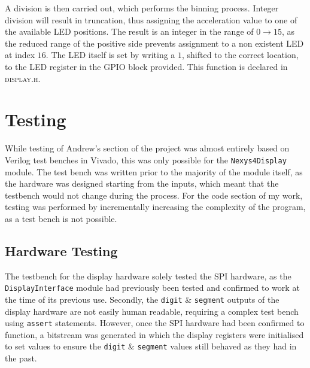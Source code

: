 \documentclass[11pt,british]{report}
\begin{document}
A division is then carried out, which performs the binning process. Integer division will result in truncation, thus assigning the acceleration value to one of the available LED positions.
The result is an integer in the range of $0\rightarrow 15$, as the reduced range of the positive side prevents assignment to a non existent LED at index $16$. The LED itself is set by writing a $1$, shifted to the correct location, to the LED register in the GPIO block provided. This function is declared in \textsc{display.h}.

\section*{Testing}
While testing of Andrew's section of the project was almost entirely based on Verilog test benches in Vivado, this was only possible for the \texttt{Nexys4Display} module. The test bench was written prior to the majority of the module itself, as the hardware was designed starting from the inputs, which meant that the testbench would not change during the process. For the code section of my work, testing was performed by incrementally increasing the complexity of the program, as a test bench is not possible.

\subsection*{Hardware Testing}
The testbench for the display hardware solely tested the SPI hardware, as the \texttt{DisplayInterface} module had previously been tested and confirmed to work at the time of its previous use. Secondly, the \texttt{digit} \& \texttt{segment} outputs of the display hardware are not easily human readable, requiring a complex test bench using \texttt{assert} statements. However, once the SPI hardware had been confirmed to function, a bitstream was generated in which the display registers were initialised to set values to ensure the \texttt{digit} \& \texttt{segment} values still behaved as they had in the past.
\end{document}
